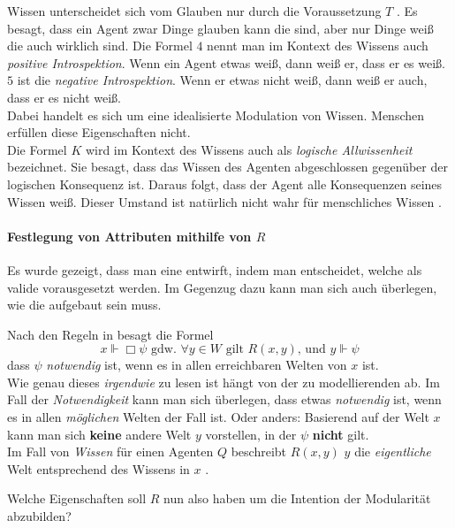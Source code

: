 Wissen unterscheidet sich vom Glauben nur durch die Voraussetzung $T$ \TFormel.
Es besagt, dass ein Agent zwar Dinge glauben kann die \false sind, aber nur Dinge weiß die auch wirklich \true sind.
Die Formel $4$ \vierFormel nennt man im Kontext des Wissens auch \emph{positive Introspektion}. 
Wenn ein Agent etwas weiß, dann weiß er, dass er es weiß.
$5$ \fuenfFormel ist die \emph{negative Introspektion}. Wenn er etwas nicht weiß, dann weiß er auch, dass er es nicht weiß.\\
Dabei handelt es sich um eine idealisierte Modulation von Wissen.
Menschen erfüllen diese Eigenschaften nicht.\\
Die Formel $K$ \KFormel wird im Kontext des Wissens auch als \emph{logische Allwissenheit} bezeichnet.
Sie besagt, dass das Wissen des Agenten abgeschlossen gegenüber der logischen Konsequenz ist.
Daraus folgt, dass der Agent alle Konsequenzen seines Wissen weiß. 
Dieser Umstand ist natürlich nicht wahr für menschliches Wissen .


\paragraph{Festlegung von Attributen mithilfe von $R$}
\label{festlegung_von_attibuten_mit_R}
Es wurde gezeigt, dass man eine \ML entwirft, indem man entscheidet, welche \formelSchemata als valide vorausgesetzt werden.
Im Gegenzug dazu kann man sich auch überlegen, wie die \KS aufgebaut sein muss.

Nach den Regeln in  besagt die Formel
\begin{equation*}
	x \Vdash \Box \psi \text{ gdw. }\forall y \in W \text{ gilt } R(x,y)\text{, und } y \Vdash \psi	
\end{equation*}
dass $\psi$ \emph{notwendig} ist, wenn es in allen erreichbaren Welten von $x$ \true ist.\\
Wie genau dieses \emph{irgendwie} zu lesen ist hängt von der zu modellierenden \ML ab.
Im Fall der \emph{Notwendigkeit} kann man sich überlegen, dass etwas \emph{notwendig} ist, wenn es in allen \emph{möglichen} Welten der Fall ist.
Oder anders: Basierend auf der Welt $x$ kann man sich \textbf{keine} andere Welt $y$ vorstellen, in der $\psi$ \textbf{nicht} gilt.\\
Im Fall von \emph{Wissen} für einen Agenten $Q$ beschreibt $R(x,y)$ $y$ die \emph{eigentliche} Welt entsprechend des Wissens in $x$ .

Welche Eigenschaften soll $R$ nun also haben um die Intention der Modularität abzubilden?

